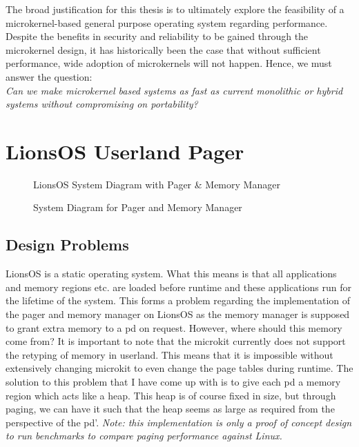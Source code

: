 \documentclass[../thesis.tex]{subfiles}
\begin{document}
The broad justification for this thesis is to ultimately explore the feasibility of a microkernel-based general purpose operating system regarding performance. Despite the benefits in security and reliability to be gained through the microkernel design, it has historically been the case that without sufficient performance, wide adoption of microkernels will not happen. Hence, we must answer the question:\\ \textit{Can we make microkernel based systems as fast as current monolithic or hybrid systems without compromising on portability?} 


\section{LionsOS Userland Pager}
\begin{figure}[H]
    \centering
    
    \caption{LionsOS System Diagram with Pager \& Memory Manager}
    \label{LionsOS System Diagram with Pager and Memory Manager}
\end{figure}

\begin{figure}[H]
    \centering
    
    
    

\caption{System Diagram for Pager and Memory Manager}
    \label{System diagram for pager and memory manager}
\end{figure}

\subsection{Design Problems}
LionsOS is a static operating system. What this means is that all applications and memory regions etc. are loaded before runtime and these applications run for the lifetime of the system. This forms a problem regarding the implementation of the pager and memory manager on LionsOS as the memory manager is supposed to grant extra memory to a \gls{pd} on request. However, where should this memory come from? It is important to note that the microkit currently does not support the retyping of memory in userland. This means that it is impossible without extensively changing microkit to even change the page tables during runtime. The solution to this problem that I have come up with is to give each \gls{pd} a memory region which acts like a heap. This heap is of course fixed in size, but through paging, we can have it such that the heap seems as large as required from the perspective of the \gls{pd}'. \textit{Note: this implementation is only a proof of concept design to run benchmarks to compare paging performance against Linux.}
\end{document}
